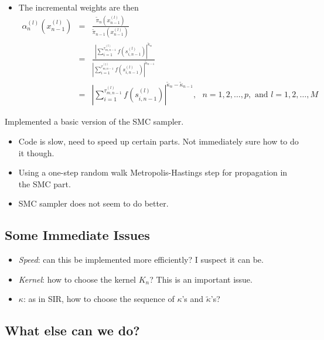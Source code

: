 \documentclass{article}
\begin{document}
\begin{itemize}
\item The incremental weights are then 
\begin{eqnarray}  
\alpha_{n}^{(l)} \left ( x_{n-1}^{(l)} \right ) & = & \frac{ \tilde{\pi}_{n} \left ( x_{n-1}^{(l)} \right ) }{ \tilde{\pi}_{n-1}\left ( x_{n-1}^{(l)} \right ) } \nonumber \\
& = & \frac{ \left | \sum_{i=1}^{\tau_{m,n-1}^{(l)}} f \left ( s_{i,n-1}^{(l)} \right ) \right |^{\tilde{\kappa}_{n}} } { \left | \sum_{i=1}^{\tau_{m,n-1}^{(l)}} f \left ( s_{i,n-1}^{(l)} \right ) \right |^{\tilde{\kappa}_{n-1}} } \nonumber \\
& = & \left | \sum_{i=1}^{\tau_{m,n-1}^{(l)}} f \left ( s_{i,n-1}^{(l)} \right ) \right |^{\tilde{\kappa}_{n} - \tilde{\kappa}_{n-1}} 
, \text{ } n = 1, 2, \ldots, p, \text{ and } l = 1, 2, \ldots, M \nonumber 
\end{eqnarray}

\end{itemize}
\vspace{0.2in}
Implemented a basic version of the SMC sampler. 

\begin{itemize}

\item Code is slow, need to speed up certain parts. Not immediately sure how to do it though. 
\item Using a one-step random walk Metropolis-Hastings step for propagation in the SMC part.
\item SMC sampler does not seem to do better.

\end{itemize}

\subsection{Some Immediate Issues}

\begin{itemize}

\item \textit{Speed}: can this be implemented more efficiently? I suspect it can be.
\item \textit{Kernel}: how to choose the kernel $K_{n}$? This is an important issue.
\item $\kappa$: as in SIR, how to choose the sequence of $\kappa$'s and $\tilde{\kappa}$'s?

\end{itemize}

\subsection{What else can we do?} 
\end{document}
